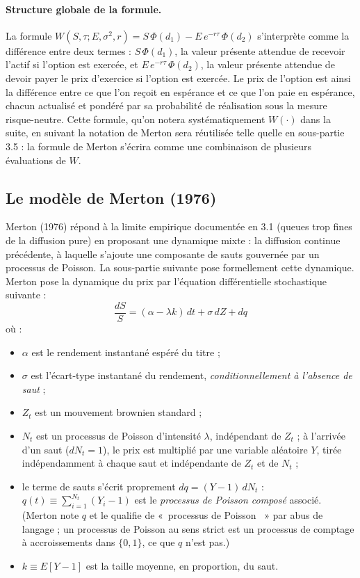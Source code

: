 \documentclass{article}
\providecommand{\og}{«~}
\providecommand{\fg}{~»}
\begin{document}
\paragraph{Structure globale de la formule.} La formule $W(S,\tau;E,\sigma^2,r) = S\,\Phi(d_1) - E\,e^{-r\tau}\,\Phi(d_2)$ s'interprète comme la différence entre deux termes : $S\,\Phi(d_1)$, la valeur présente attendue de recevoir l'actif si l'option est exercée, et $E\,e^{-r\tau}\,\Phi(d_2)$, la valeur présente attendue de devoir payer le prix d'exercice si l'option est exercée. Le prix de l'option est ainsi la différence entre ce que l'on reçoit en espérance et ce que l'on paie en espérance, chacun actualisé et pondéré par sa probabilité de réalisation sous la mesure risque-neutre.
Cette formule, qu'on notera systématiquement $W(\cdot)$ dans la suite, en suivant la notation de Merton sera réutilisée telle quelle en sous-partie 3.5 : la formule de Merton s'écrira comme une combinaison de plusieurs évaluations de $W$.
\subsection{Le modèle de Merton (1976)}
Merton (1976) répond à la limite empirique documentée en 3.1 (queues trop fines de la diffusion pure) en proposant une dynamique mixte : la diffusion continue précédente, à laquelle s'ajoute une composante de sauts gouvernée par un processus de Poisson. La sous-partie suivante pose formellement cette dynamique.
Merton pose la dynamique du prix par l'équation différentielle stochastique suivante :
\begin{equation}
\frac{dS}{S} = (\alpha - \lambda k)\, dt + \sigma\, dZ + dq
\label{eq:merton}
\end{equation}
où :
\begin{itemize}
\item $\alpha$ est le rendement instantané espéré du titre ;
\item $\sigma$ est l'écart-type instantané du rendement, \emph{conditionnellement à l'absence de saut} ;
\item $Z_t$ est un mouvement brownien standard ;
\item $N_t$ est un processus de Poisson d'intensité $\lambda$, indépendant de $Z_t$ ; à l'arrivée d'un saut ($dN_t=1$), le prix est multiplié par une variable aléatoire $Y$, tirée indépendamment à chaque saut et indépendante de $Z_t$ et de $N_t$ ;
\item le terme de sauts s'écrit proprement $dq = (Y-1)\,dN_t$ : $q(t)\equiv\sum_{i=1}^{N_t}(Y_i-1)$ est le \emph{processus de Poisson composé} associé. (Merton note $q$ et le qualifie de \og processus de Poisson \fg{} par abus de langage ; un processus de Poisson au sens strict est un processus de comptage à accroissements dans $\{0,1\}$, ce que $q$ n'est pas.)
\item $k \equiv E[Y-1]$ est la taille moyenne, en proportion, du saut.
\end{itemize}
\end{document}
